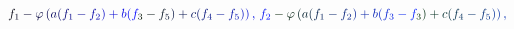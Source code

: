 \documentclass[12pt]{article}
\begin{document}
\makeatletter
\renewcommand*{\@textcolor}[3]{%
  \protect\leavevmode
  \begingroup
    \color#1{#2}#3%
  \endgroup
}
\makeatother
\begin{displaymath}
\mathcolor[RGB]{0,0,15}{f} _ { \mathcolor[RGB]{0,0,30}{1} } \mathcolor[RGB]{0,0,45}{-} \mathcolor[RGB]{0,0,60}{\varphi} \mathcolor[RGB]{0,0,75}{\left(} \mathcolor[RGB]{0,0,90}{a} \mathcolor[RGB]{0,0,105}{(} \mathcolor[RGB]{0,0,120}{f} _ { \mathcolor[RGB]{0,0,135}{1} } \mathcolor[RGB]{0,0,150}{-} \mathcolor[RGB]{0,0,165}{f} _ { \mathcolor[RGB]{0,0,180}{2} } \mathcolor[RGB]{0,0,195}{)} \mathcolor[RGB]{0,0,210}{+} \mathcolor[RGB]{0,0,225}{b} \mathcolor[RGB]{0,0,240}{(} \mathcolor[RGB]{0,0,255}{f} _ { \mathcolor[RGB]{0,15,0}{3} } \mathcolor[RGB]{0,15,15}{-} \mathcolor[RGB]{0,15,30}{f} _ { \mathcolor[RGB]{0,15,45}{5} } \mathcolor[RGB]{0,15,60}{)} \mathcolor[RGB]{0,15,75}{+} \mathcolor[RGB]{0,15,90}{c} \mathcolor[RGB]{0,15,105}{(} \mathcolor[RGB]{0,15,120}{f} _ { \mathcolor[RGB]{0,15,135}{4} } \mathcolor[RGB]{0,15,150}{-} \mathcolor[RGB]{0,15,165}{f} _ { \mathcolor[RGB]{0,15,180}{5} } \mathcolor[RGB]{0,15,195}{)} \mathcolor[RGB]{0,15,210}{\right)} \mathcolor[RGB]{0,15,225}{,} \mathcolor[RGB]{0,15,240}{\,
f} _ { \mathcolor[RGB]{0,15,255}{2} } \mathcolor[RGB]{0,30,0}{-} \mathcolor[RGB]{0,30,15}{\varphi} \mathcolor[RGB]{0,30,30}{\left(} \mathcolor[RGB]{0,30,45}{a} \mathcolor[RGB]{0,30,60}{(} \mathcolor[RGB]{0,30,75}{f} _ { \mathcolor[RGB]{0,30,90}{1} } \mathcolor[RGB]{0,30,105}{-} \mathcolor[RGB]{0,30,120}{f} _ { \mathcolor[RGB]{0,30,135}{2} } \mathcolor[RGB]{0,30,150}{)} \mathcolor[RGB]{0,30,165}{+} \mathcolor[RGB]{0,30,180}{b} \mathcolor[RGB]{0,30,195}{(} \mathcolor[RGB]{0,30,210}{f} _ { \mathcolor[RGB]{0,30,225}{3} } \mathcolor[RGB]{0,30,240}{-} \mathcolor[RGB]{0,30,255}{f} _ { \mathcolor[RGB]{0,45,0}{3} } \mathcolor[RGB]{0,45,15}{)} \mathcolor[RGB]{0,45,30}{+} \mathcolor[RGB]{0,45,45}{c} \mathcolor[RGB]{0,45,60}{(} \mathcolor[RGB]{0,45,75}{f} _ { \mathcolor[RGB]{0,45,90}{4} } \mathcolor[RGB]{0,45,105}{-} \mathcolor[RGB]{0,45,120}{f} _ { \mathcolor[RGB]{0,45,135}{5} } \mathcolor[RGB]{0,45,150}{)} \mathcolor[RGB]{0,45,165}{\right)} \mathcolor[RGB]{0,45,180}{,} \mathcolor[RGB]{0,45,195}{\,
}
\end{displaymath}
\end{document}
